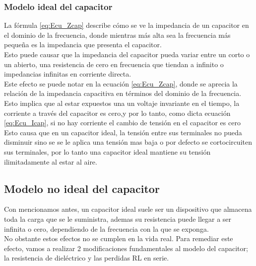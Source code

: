 \documentclass[journal]{IEEEtran}
\begin{document}
\subsubsection{Modelo ideal del capacitor}
La fórmula \ref{eq:Ecu_Zcap} describe cómo se ve la impedancia de un capacitor en el dominio de la frecuencia, donde mientras más alta sea la frecuencia más pequeña es la impedancia que presenta el capacitor.\\
Esto puede causar que la impedancia del capacitor pueda variar entre un corto o un abierto, una resistencia de cero en frecuencia que tiendan a infinito o impedancias infinitas en corriente directa.\\ Este efecto se puede notar en la ecuación \ref{eq:Ecu_Zcap}, donde se aprecia la relación de la impedancia capacitiva en términos del dominio de la frecuencia.\\Esto implica que al estar expuestos una un voltaje invariante en el tiempo, la corriente a través del capacitor es cero,y por lo tanto, como dicta ecuación \ref{eq:Ecu_Icap}, si no hay corriente el cambio de tensión en el capacitor es cero\\ Esto causa que en un capacitor ideal, la tensión entre sus terminales no pueda disminuir sino se se le aplica una tensión mas baja o por defecto se cortocircuiten sus terminales, por lo tanto una capacitor ideal mantiene su tensión ilimitadamente al estar al aire.


\subsection{Modelo no ideal del capacitor}
Con mencionamos antes, un capacitor ideal suele ser un dispositivo que almacena toda la carga que se le suministra, ademas su resistencia puede llegar a ser infinita o cero, dependiendo de la frecuencia con la que se exponga. \\ No obstante estos efectos no se cumplen en la vida real. Para remediar este efecto, vamos a realizar 2 modificaciones fundamentales al modelo del capacitor; la resistencia de dieléctrico y las perdidas RL en serie. 
\end{document}
